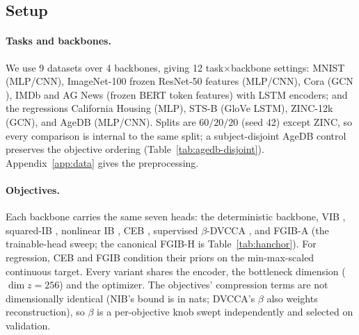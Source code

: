 \documentclass{article} %
\newcommand{\KLd}{\operatorname{KL}}
\begin{document}
\subsection{Setup}

\paragraph{Tasks and backbones.}
We use 9 datasets over 4 backbones, giving 12 task$\times$backbone settings: MNIST
\citep{lecun1998mnist} (MLP/CNN), ImageNet-100 \citep{deng2009imagenet} frozen
ResNet-50 \citep{he2016resnet} features (MLP/CNN), Cora \citep{sen2008collective}
(GCN \citep{kipf2017gcn}), IMDb \citep{maas2011imdb} and AG News
\citep{zhang2015character} (frozen BERT \citep{devlin2019bert} token features) with
LSTM \citep{hochreiter1997lstm} encoders; and the regressions California Housing
\citep{pace1997sparse} (MLP), STS-B \citep{cer2017semeval,wang2019glue} (GloVe
\citep{pennington2014glove} LSTM), ZINC-12k \citep{dwivedi2023benchmarking} (GCN), and
AgeDB \citep{moschoglou2017agedb} (MLP/CNN). Splits are $60/20/20$ (seed 42) except
ZINC, so every comparison is internal to the same split; a subject-disjoint AgeDB
control preserves the objective ordering (Table~\ref{tab:agedb-disjoint}).
Appendix~\ref{app:data} gives the preprocessing.

\paragraph{Objectives.}
Each backbone carries the same seven heads: the deterministic backbone, VIB
\citep{alemi2017vib}, squared-IB \citep[SVIB, penalty $\beta\KLd^2$]{kolchinsky2019caveats},
nonlinear IB \citep[NIB, non-parametric pairwise bound, learned noise
variance]{kolchinsky2019nib}, CEB \citep[diagonal-Gaussian backward
encoder]{fischer2020ceb}, supervised $\beta$-DVCCA
\citep[VIB plus an input-reconstruction decoder]{abdelaleem2025dvmib}, and FGIB-A (the
trainable-head sweep; the canonical FGIB-H is Table~\ref{tab:hanchor}). For regression,
CEB and FGIB condition their priors on the min-max-scaled continuous target. Every
variant shares the encoder, the bottleneck dimension ($\dim z = 256$) and the
optimizer. The objectives' compression terms are not dimensionally identical (NIB's
bound is in nats; DVCCA's $\beta$ also weights reconstruction), so $\beta$ is a
per-objective knob swept independently and selected on validation.
\end{document}

